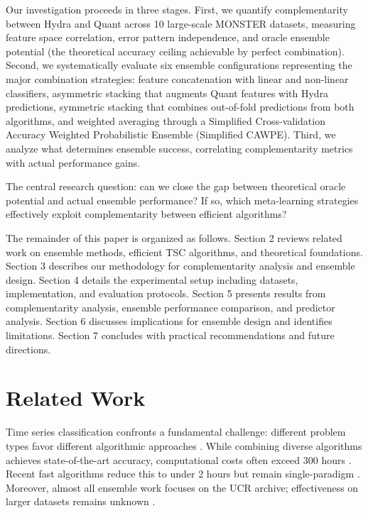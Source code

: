 \documentclass[pdflatex,sn-basic]{sn-jnl}           %
\theoremstyle{thmstyleone}%
\theoremstyle{thmstyletwo}%
\theoremstyle{thmstylethree}%
\begin{document}
Our investigation proceeds in three stages. First, we quantify complementarity between Hydra and Quant across 10 large-scale MONSTER datasets, measuring feature space correlation, error pattern independence, and oracle ensemble potential (the theoretical accuracy ceiling achievable by perfect combination). Second, we systematically evaluate six ensemble configurations representing the major combination strategies: feature concatenation with linear and non-linear classifiers, asymmetric stacking that augments Quant features with Hydra predictions, symmetric stacking that combines out-of-fold predictions from both algorithms, and weighted averaging through a Simplified Cross-validation Accuracy Weighted Probabilistic Ensemble (Simplified CAWPE). Third, we analyze what determines ensemble success, correlating complementarity metrics with actual performance gains.

The central research question: can we close the gap between theoretical oracle potential and actual ensemble performance? If so, which meta-learning strategies effectively exploit complementarity between efficient algorithms?

The remainder of this paper is organized as follows. Section 2 reviews related work on ensemble methods, efficient TSC algorithms, and theoretical foundations. Section 3 describes our methodology for complementarity analysis and ensemble design. Section 4 details the experimental setup including datasets, implementation, and evaluation protocols. Section 5 presents results from complementarity analysis, ensemble performance comparison, and predictor analysis. Section 6 discusses implications for ensemble design and identifies limitations. Section 7 concludes with practical recommendations and future directions.


\section{Related Work}\label{sec2}

Time series classification confronts a fundamental challenge: different problem types favor different algorithmic approaches \citep{tsc-bakeoff}. While combining diverse algorithms achieves state-of-the-art accuracy, computational costs often exceed 300 hours \citep{hive-cote-2}. Recent fast algorithms reduce this to under 2 hours but remain single-paradigm \citep{rocket, hydra, quant}. Moreover, almost all ensemble work focuses on the UCR archive; effectiveness on larger datasets remains unknown \citep{bakeoff-redux}.
\end{document}
